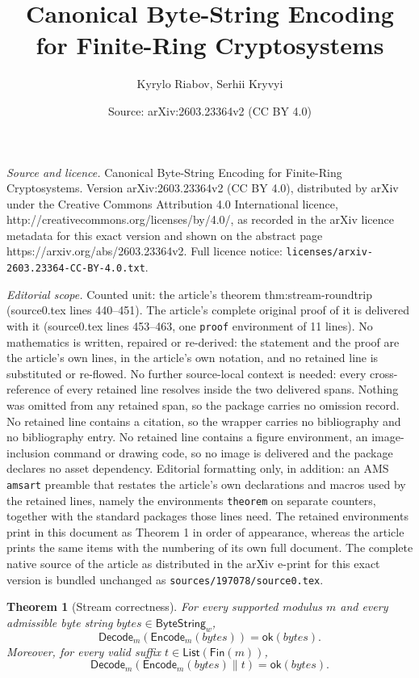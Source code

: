 \documentclass[10pt,a4paper]{amsart}
\title{Canonical Byte-String Encoding for Finite-Ring Cryptosystems}
\author{Kyrylo Riabov, Serhii Kryvyi}
\date{Source: arXiv:2603.23364v2 (CC BY 4.0)}
\newtheorem{theorem}{Theorem}
\newcommand{\ByteString}{\mathsf{ByteString}}
\newcommand{\ByteStringBounded}{\ByteString_{w}}
\newcommand{\BytesVar}{\mathit{bytes}}
\newcommand{\DecodeM}{\mathsf{Decode}_m}
\newcommand{\EncodeM}{\mathsf{Encode}_m}
\newcommand{\Fin}{\mathsf{Fin}}
\newcommand{\List}{\mathsf{List}}
\newcommand{\OK}{\mathsf{ok}}
\newcommand{\concat}{\mathbin{\|}}
\begin{document}
\maketitle

\noindent\emph{Source and licence.} Canonical Byte-String Encoding for Finite-Ring Cryptosystems. Version arXiv:2603.23364v2 (CC BY 4.0), distributed by arXiv under the Creative Commons Attribution 4.0 International licence, http://creativecommons.org/licenses/by/4.0/, as recorded in the arXiv licence metadata for this exact version and shown on the abstract page https://arxiv.org/abs/2603.23364v2. Full licence notice: \texttt{licenses/arxiv-2603.23364-CC-BY-4.0.txt}.\par\smallskip

\noindent\textit{Editorial scope.} Counted unit: the article's theorem thm:stream-roundtrip (source0.tex lines 440--451). The article's complete original proof of it is delivered with it (source0.tex lines 453--463, one \texttt{proof} environment of 11 lines). No mathematics is written, repaired or re-derived: the statement and the proof are the article's own lines, in the article's own notation, and no retained line is substituted or re-flowed.  No further source-local context is needed: every cross-reference of every retained line resolves inside the two delivered spans.  Nothing was omitted from any retained span, so the package carries no omission record.  No retained line contains a citation, so the wrapper carries no bibliography and no bibliography entry.  No retained line contains a figure environment, an image-inclusion command or drawing code, so no image is delivered and the package declares no asset dependency.  Editorial formatting only, in addition: an AMS \texttt{amsart} preamble that restates the article's own declarations and macros used by the retained lines, namely the environments \texttt{theorem} on separate counters, together with the standard packages those lines need.  The retained environments print in this document as Theorem 1 in order of appearance, whereas the article prints the same items with the numbering of its own full document.  The complete native source of the article as distributed in the arXiv e-print for this exact version is bundled unchanged as \texttt{sources/197078/source0.tex}.
    \begin{theorem}[Stream correctness]
        \label{thm:stream-roundtrip}
        For every supported modulus \(m\) and every admissible byte string
        \(\BytesVar \in \ByteStringBounded\),
        \[
            \DecodeM(\EncodeM(\BytesVar)) = \OK(\BytesVar).
        \]
        Moreover, for every valid suffix \(t \in \List(\Fin(m))\),
        \[
            \DecodeM(\EncodeM(\BytesVar) \concat t) = \OK(\BytesVar).
        \]
    \end{theorem}
\end{document}
